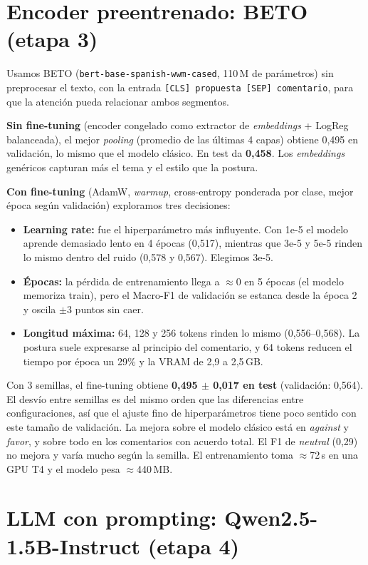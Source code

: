 \documentclass[10pt,a4paper]{article}
\newcommand{\cod}[1]{\texttt{\small #1}}
\begin{document}
\section{Encoder preentrenado: BETO (etapa 3)}

Usamos BETO (\cod{bert-base-spanish-wwm-cased}, 110\,M de parámetros) sin preprocesar el texto, con la entrada \cod{[CLS] propuesta [SEP] comentario}, para que la atención pueda relacionar ambos segmentos.

\textbf{Sin fine-tuning} (encoder congelado como extractor de \emph{embeddings} + LogReg balanceada), el mejor \emph{pooling} (promedio de las últimas 4 capas) obtiene 0,495 en validación, lo mismo que el modelo clásico. En test da \textbf{0,458}. Los \emph{embeddings} genéricos capturan más el tema y el estilo que la postura.

\textbf{Con fine-tuning} (AdamW, \emph{warmup}, cross-entropy ponderada por clase, mejor época según validación) exploramos tres decisiones:
\begin{itemize}
  \item \textbf{Learning rate:} fue el hiperparámetro más influyente. Con 1e-5 el modelo aprende demasiado lento en 4 épocas (0,517), mientras que 3e-5 y 5e-5 rinden lo mismo dentro del ruido (0,578 y 0,567). Elegimos 3e-5.
  \item \textbf{Épocas:} la pérdida de entrenamiento llega a $\approx$0 en 5 épocas (el modelo memoriza train), pero el Macro-F1 de validación se estanca desde la época 2 y oscila $\pm$3 puntos sin caer.
  \item \textbf{Longitud máxima:} 64, 128 y 256 tokens rinden lo mismo (0,556--0,568). La postura suele expresarse al principio del comentario, y 64 tokens reducen el tiempo por época un 29\% y la VRAM de 2,9 a 2,5\,GB.
\end{itemize}
Con 3 semillas, el fine-tuning obtiene \textbf{0,495 $\pm$ 0,017 en test} (validación: 0,564). El desvío entre semillas es del mismo orden que las diferencias entre configuraciones, así que el ajuste fino de hiperparámetros tiene poco sentido con este tamaño de validación. La mejora sobre el modelo clásico está en \emph{against} y \emph{favor}, y sobre todo en los comentarios con acuerdo total. El F1 de \emph{neutral} (0,29) no mejora y varía mucho según la semilla. El entrenamiento toma $\approx$72\,s en una GPU T4 y el modelo pesa $\approx$440\,MB.

\section{LLM con prompting: Qwen2.5-1.5B-Instruct (etapa 4)}
\end{document}

